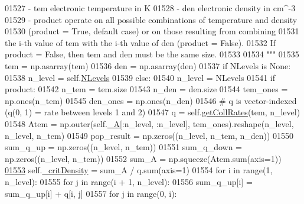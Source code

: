 \begin{DoxyCode}
{{01527 \textcolor{stringliteral}{            - tem       electronic temperature in K}
01528 \textcolor{stringliteral}{            - den       electronic density in cm^-3}
01529 \textcolor{stringliteral}{            - product   operate on all possible combinations of temperature and density }
01530 \textcolor{stringliteral}{                      (product = True, default case) or on those resulting from combining }
01531 \textcolor{stringliteral}{                      the i-th value of tem with the i-th value of den (product = False).}
01532 \textcolor{stringliteral}{                      If product = False, then tem and den must be the same size.}
01533 \textcolor{stringliteral}{}
01534 \textcolor{stringliteral}{        """}
01535         tem = np.asarray(tem)
01536         den = np.asarray(den)
01537         \textcolor{keywordflow}{if} NLevels \textcolor{keywordflow}{is} \textcolor{keywordtype}{None}:
01538             n\_level = self.\hyperlink{classpyneb_1_1core_1_1pynebcore_1_1_atom_a6b43c1e6431a6786c1b4267f704fb4e8}{NLevels}
01539         \textcolor{keywordflow}{else}:
01540             n\_level = NLevels
01541         \textcolor{keywordflow}{if} product:
01542             n\_tem = tem.size
01543             n\_den = den.size
01544             tem\_ones = np.ones(n\_tem)
01545             den\_ones = np.ones(n\_den)
01546             \textcolor{comment}{# q is vector-indexed (q(0, 1) = rate between levels 1 and 2)}
01547             q = self.\hyperlink{classpyneb_1_1core_1_1pynebcore_1_1_atom_a34711ea989baf7bde752a68255d32098}{getCollRates}(tem, n\_level)
01548             Atem = np.outer(self.\hyperlink{classpyneb_1_1core_1_1pynebcore_1_1_atom_aa6416fe661b8deaa008179314727e025}{\_A}[:n\_level, :n\_level], tem\_ones).reshape(n\_level, n\_level, n\_tem)
01549             pop\_result = np.zeros((n\_level, n\_tem, n\_den))
01550             sum\_q\_up = np.zeros((n\_level, n\_tem))
01551             sum\_q\_down = np.zeros((n\_level, n\_tem))
01552             sum\_A = np.squeeze(Atem.sum(axis=1))
\hypertarget{pynebcore_8py_source_l01553}{}\hyperlink{classpyneb_1_1core_1_1pynebcore_1_1_atom_a1d0823a36ca030fd149522fe72908631}{01553}             self.\hyperlink{classpyneb_1_1core_1_1pynebcore_1_1_atom_a1d0823a36ca030fd149522fe72908631}{\_critDensity} = sum\_A / q.sum(axis=1)
01554             \textcolor{keywordflow}{for} i \textcolor{keywordflow}{in} range(1, n\_level):
01555                 \textcolor{keywordflow}{for} j \textcolor{keywordflow}{in} range(i + 1, n\_level):
01556                     sum\_q\_up[i] = sum\_q\_up[i] + q[i, j]
01557                 \textcolor{keywordflow}{for} j \textcolor{keywordflow}{in} range(0, i):
}}
\end{DoxyCode}
